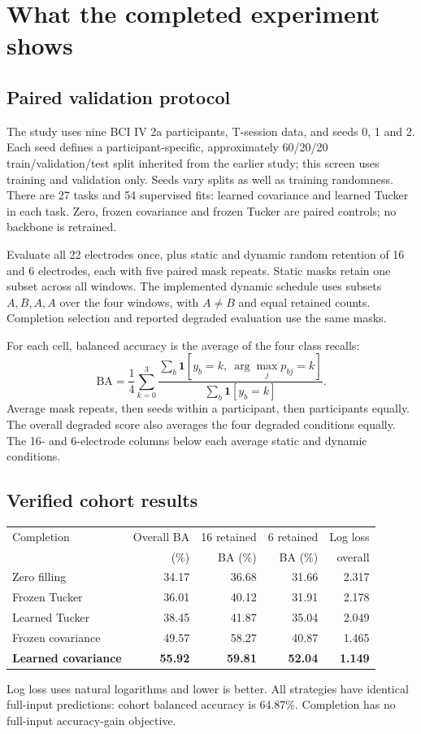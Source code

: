 \documentclass[11pt,a4paper]{article}
\begin{document}
\newpage
\section{What the completed experiment shows}
\subsection{Paired validation protocol}
The study uses nine BCI IV 2a participants, T-session data, and seeds 0, 1 and 2.
Each seed defines a participant-specific, approximately 60/20/20 train/validation/test
split inherited from the earlier study; this screen uses training and validation
only. Seeds vary splits as well as training randomness. There are 27 tasks and
54 supervised fits: learned covariance and learned Tucker in each task. Zero,
frozen covariance and frozen Tucker are paired controls; no backbone is retrained.

Evaluate all 22 electrodes once, plus static and dynamic random retention of
16 and 6 electrodes, each with five paired mask repeats. Static masks retain
one subset across all windows. The implemented dynamic schedule uses subsets
$A,B,A,A$ over the four windows, with $A\ne B$ and equal retained counts.
Completion selection and reported degraded evaluation use the same masks.

For each cell, balanced accuracy is the average of the four class recalls:
\begin{equation}
 \mathrm{BA}=\frac14\sum_{k=0}^3
 \frac{\sum_b\mathbf 1[y_b=k,\ \arg\max_j p_{bj}=k]}{\sum_b\mathbf 1[y_b=k]}.
\end{equation}
Average mask repeats, then seeds within a participant, then participants equally.
The overall degraded score also averages the four degraded conditions equally.
The 16- and 6-electrode columns below each average static and dynamic conditions.

\subsection{Verified cohort results}
\begin{center}
\begin{tabular}{@{}lrrrr@{}}\toprule
Completion & Overall BA & 16 retained & 6 retained & Log loss\\
 & (\%) & BA (\%) & BA (\%) & overall\\ \midrule
Zero filling & 34.17 & 36.68 & 31.66 & 2.317\\
Frozen Tucker & 36.01 & 40.12 & 31.91 & 2.178\\
Learned Tucker & 38.45 & 41.87 & 35.04 & 2.049\\
Frozen covariance & 49.57 & 58.27 & 40.87 & 1.465\\
\textbf{Learned covariance} & \textbf{55.92} & \textbf{59.81} & \textbf{52.04} & \textbf{1.149}\\ \bottomrule
\end{tabular}
\end{center}
Log loss uses natural logarithms and lower is better. All strategies have
identical full-input predictions: cohort balanced accuracy is 64.87\%.
Completion has no full-input accuracy-gain objective.
\end{document}
